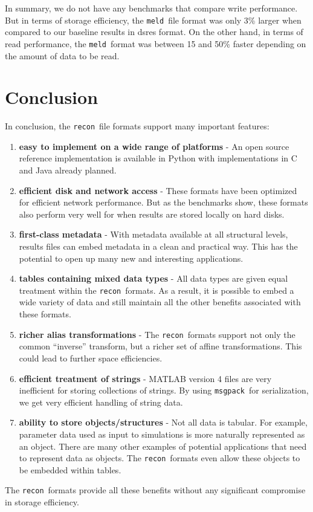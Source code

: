 \documentclass[11pt,a4paper,twocolumn]{article}
\newcommand{\recon}{\texttt{recon}}
\newcommand{\meld}{\texttt{meld}}
\newcommand{\msgpack}{\texttt{msgpack}}
\begin{document}
In summary, we do not have any benchmarks that compare write
performance.  But in terms of storage efficiency, the \meld\ file
format was only 3\% larger when compared to our baseline results in
dsres format.  On the other hand, in terms of read performance, the
\meld\ format was between 15 and 50\% faster depending on the amount
of data to be read.

\section{Conclusion}
\label{sec:conclusion}

In conclusion, the \recon\ file formats support many important features:
\begin{enumerate}
\item \textbf{easy to implement on a wide range of platforms} - An open
  source reference implementation is available in Python with
  implementations in C and Java already planned.
\item \textbf{efficient disk and network access} - These formats have been
  optimized for efficient network performance.  But as the benchmarks
  show, these formats also perform very well for when results are
  stored locally on hard disks.
\item \textbf{first-class metadata} - With metadata available at all
  structural levels, results files can embed metadata in a clean and
  practical way.  This has the potential to open up many new and
  interesting applications.
\item \textbf{tables containing mixed data types} - All data types are
  given equal treatment within the \recon\ formats.  As a result, it
  is possible to embed a wide variety of data and still maintain all
  the other benefits associated with these formats.
\item \textbf{richer alias transformations} - The \recon\ formats support
  not only the common ``inverse'' transform, but a richer set of
  affine transformations.  This could lead to further space
  efficiencies.
\item \textbf{efficient treatment of strings} - MATLAB version 4 files are
  very inefficient for storing collections of strings.  By using
  \msgpack\ for serialization, we get very efficient handling of
  string data.
\item \textbf{ability to store objects/structures} - Not all data is
  tabular.  For example, parameter data used as input to simulations
  is more naturally represented as an object.  There are many other
  examples of potential applications that need to represent data as
  objects.  The \recon\ formats even allow these objects to be
  embedded within tables.
\end{enumerate}

The \recon\ formats provide all these benefits without any significant
compromise in storage efficiency.


\end{document}
